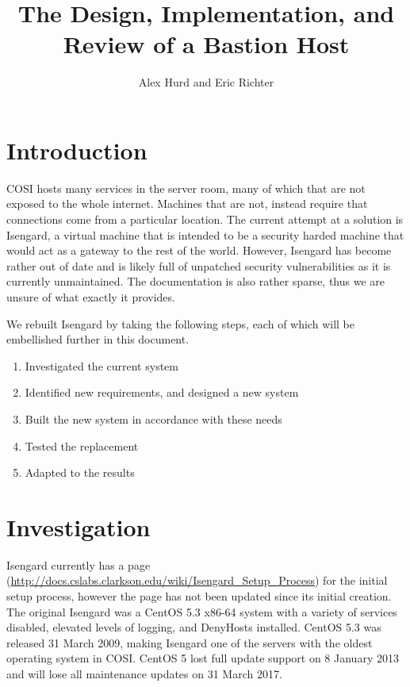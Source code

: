 \documentclass[11pt]{article}
\title{The Design, Implementation, and Review of a Bastion Host}
\author{{Alex Hurd} and {Eric Richter}}
\begin{document}
\maketitle
\newpage
\section*{Introduction}
\begin{paragraph}\indent
COSI hosts many services in the server room, many of which that are not exposed to the whole internet.
Machines that are not, instead require that connections come from a particular location.
The current attempt at a solution is Isengard, a virtual machine that is intended to be a security harded machine that would act as a gateway to the rest of the world.
However, Isengard has become rather out of date and is likely full of unpatched security vulnerabilities as it is currently unmaintained.
The documentation is also rather sparse, thus we are unsure of what exactly it provides.
\end{paragraph}

\begin{paragraph}\indent
We rebuilt Isengard by taking the following steps, each of which will be embellished further in this document.
\begin{enumerate}
  \item Investigated the current system
  \item Identified new requirements, and designed a new system
  \item Built the new system in accordance with these needs
  \item Tested the replacement
  \item Adapted to the results
\end{enumerate}
\end{paragraph}

\section{Investigation}
\begin{paragraph}\indent
Isengard currently has a page (\url{http://docs.cslabs.clarkson.edu/wiki/Isengard_Setup_Process}) for the initial setup process, however the page has not been updated since its initial creation.
The original Isengard was a CentOS 5.3 x86-64 system with a variety of services disabled, elevated levels of logging, and DenyHosts installed.
CentOS 5.3 was released 31 March 2009, making Isengard one of the servers with the oldest operating system in COSI. CentOS 5 lost full update support on 8 January 2013 and will lose all maintenance updates on 31 March 2017.
\end{paragraph}
\end{document}
